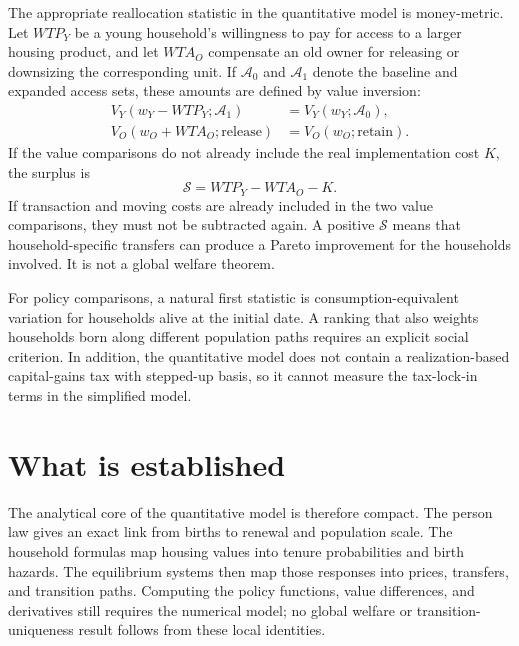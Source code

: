 \documentclass[11pt]{article}
\begin{document}
The appropriate reallocation statistic in the quantitative model is
money-metric.  Let $WTP_Y$ be a young household's willingness to pay for access
to a larger housing product, and let $WTA_O$ compensate an old owner for
releasing or downsizing the corresponding unit.  If $\mathcal A_0$ and
$\mathcal A_1$ denote the baseline and expanded access sets, these amounts are
defined by value inversion:
\begin{align}
 V_Y(w_Y-WTP_Y;\mathcal A_1)&=V_Y(w_Y;\mathcal A_0),\\
 V_O(w_O+WTA_O;\text{release})&=V_O(w_O;\text{retain}).
 \label{eq:money_metric_definitions}
\end{align}
If the value comparisons do not already include the real implementation cost
$K$, the surplus is
\begin{equation}
 \mathcal S=WTP_Y-WTA_O-K.
 \label{eq:money_metric_surplus}
\end{equation}
If transaction and moving costs are already included in the two value
comparisons, they must not be subtracted again.  A positive $\mathcal S$ means
that household-specific transfers can produce a Pareto improvement for the
households involved.  It is not a global welfare theorem.

For policy comparisons, a natural first statistic is consumption-equivalent
variation for households alive at the initial date.  A ranking that also
weights households born along different population paths requires an explicit
social criterion.  In addition, the quantitative model does not contain a
realization-based capital-gains tax with stepped-up basis, so it cannot measure
the tax-lock-in terms in the simplified model.

\section{What is established}

The analytical core of the quantitative model is therefore compact.  The
person law gives an exact link from births to renewal and population scale.
The household formulas map housing values into tenure probabilities and birth
hazards.  The equilibrium systems then map those responses into prices,
transfers, and transition paths.  Computing the policy functions, value
differences, and derivatives still requires the numerical model; no global
welfare or transition-uniqueness result follows from these local identities.
\end{document}
